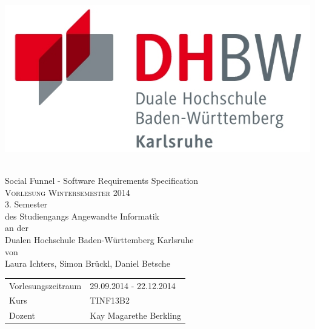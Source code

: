 \begin{titlepage}
	\begin{center}
		\begin{minipage}{0.4\textwidth}
			\begin{flushleft}
				\includegraphics[scale=0.9]{./logos/DHBW}
			\end{flushleft}
		\end{minipage}
		\begin{minipage}{0.4\textwidth}
			\begin{flushright}
			\end{flushright}
		\end{minipage}
		\\[1.5cm]
		{\LARGE Social Funnel - Software Requirements Specification}\\[1.5cm]

		\textsc{\Large Vorlesung Wintersemester 2014}\\[1.5cm]

		3. Semester\\
		des Studiengangs Angewandte Informatik\\
		an der\\
		Dualen Hochschule Baden-Württemberg Karlsruhe\\[1.5cm]
		von\\
		Laura Ichters, Simon Brückl, Daniel Betsche\\

		\vfill

		\begin{tabular}{l l}
			Vorlesungszeitraum	& 29.09.2014 - 22.12.2014 \\
			Kurs			& TINF13B2 \\
			Dozent		& Kay Magarethe Berkling
		\end{tabular}
	\end{center}
\end{titlepage}
